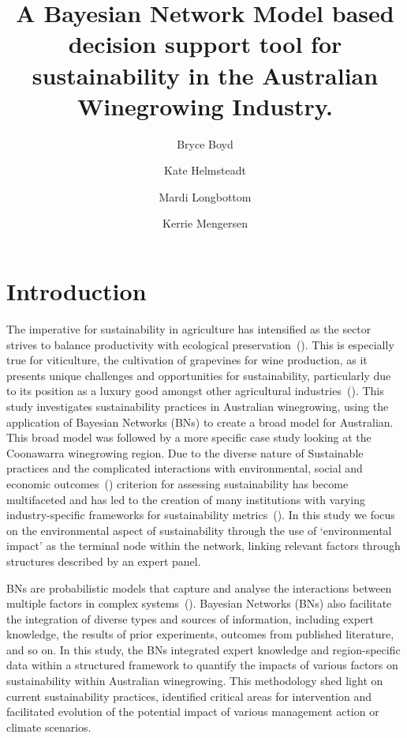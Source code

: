 \documentclass[fleqn,10pt]{wlscirep}
\title{A Bayesian Network Model based decision support tool for sustainability in the Australian Winegrowing Industry.}
\author[1,2,3,*]{Bryce Boyd}
\author[1]{Kate Helmsteadt}
\author[2]{Mardi Longbottom}
\author[1]{Kerrie Mengersen}
\affil[1]{QUT, Mathematical Sciences, Brisbane, Australia}
\affil[2]{AWRI, Adelaide, Australia}
\affil[3]{Food Agility CRC}
\affil[*]{bryce.polley@awri.com.au}
\begin{document}

\flushbottom
\maketitle

\thispagestyle{empty}

\section*{Introduction}
The imperative for sustainability in agriculture has intensified as the sector strives to balance productivity with ecological preservation~(\cite{baianoOverviewSustainabilityWine2021,corboEnvironmentalSustainabilityPrograms2014}). This is especially true for viticulture, the cultivation of grapevines for wine production, as it presents unique challenges and opportunities for sustainability, particularly due to its position as a luxury good amongst other agricultural industries~(\cite{longbottomExploringLinksSustainability2018,ferraraLifeCycleAssessment2018}). This study investigates sustainability practices in Australian winegrowing, using the application of Bayesian Networks (BNs) to create a broad model for Australian. This broad model was followed by a more specific case study looking at the Coonawarra winegrowing region. Due to the diverse nature of Sustainable practices and the complicated interactions with environmental, social and economic outcomes~(\cite{beaumelleBiodiversityConservationEcosystem2023}) criterion for assessing sustainability has become multifaceted and has led to the creation of many institutions with varying industry-specific frameworks for sustainability metrics~(\cite{baianoOverviewSustainabilityWine2021,montalvo-falconSustainabilityResearchWine2023, wayeCarbonFootprintsFood2008}). In this study we focus on the environmental aspect of sustainability through the use of `environmental impact' as the terminal node within the network, linking relevant factors through structures described by an expert panel.

BNs are probabilistic models that capture and analyse the interactions between multiple factors in complex systems~(\cite{korbBayesianArtificialIntelligence2011}). Bayesian Networks (BNs) also facilitate the integration of diverse types and sources of information, including expert knowledge, the results of prior experiments, outcomes from published literature, and so on. In this study, the BNs integrated expert knowledge and region-specific data within a structured framework to quantify the impacts of various factors on sustainability within Australian winegrowing. This methodology shed light on current sustainability practices, identified critical areas for intervention and facilitated evolution of the potential impact of various management action or climate scenarios.
\end{document}
